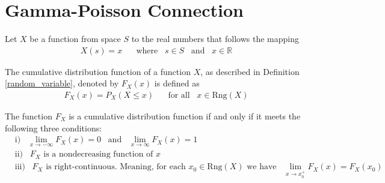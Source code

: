 \section{Gamma-Poisson Connection}

\begin{definition}
Let $X$ be a function from space $S$ to the real numbers that follows the mapping
\begin{align*}
    X(s) = x \hspace{20pt} \text{where} \hspace{10pt} s \in S \hspace{10pt} \text{and} \hspace{10pt} x \in \mathbb{R}
\end{align*}
\label{random_variable}
\end{definition}

\begin{definition}
The cumulative distribution function of a function $X$, as described in Definition \ref{random_variable}, denoted by $F_{X}(x)$ is defined as
\begin{align*}
    F_{X}(x) = P_{X}(X \leq x) \hspace{20pt} \text{for all} \hspace{10pt} x \in \text{Rng}(X)
\end{align*}
\label{cumulative_distribution_function}
\end{definition}

\begin{theorem}
The function $F_{X}$ is a cumulative distribution function if and only if it meets the following three conditions:
\begin{align*}
    &\text{i)} \hspace{10pt} \lim_{x \longrightarrow -\infty} F_{X}(x) = 0 \hspace{10pt} \text{and} \hspace{10pt} \lim_{x \longrightarrow \infty} F_{X}(x) = 1\\[2ex]
    &\text{ii)} \hspace{10pt} F_{X} \hspace{4pt} \text{is a nondecreasing function of} \hspace{4pt} x\\[2ex]
    &\text{iii)} \hspace{10pt} F_{X} \hspace{4pt} \text{is right-continuous. Meaning, for each} \hspace{4pt} x_{0} \in \text{Rng}(X) \hspace{4pt} \text{we have} \hspace{10pt} \lim_{x \longrightarrow x_{0}^{+}} F_{X}(x) = F_{X}(x_{0})
\end{align*}
\end{theorem}


